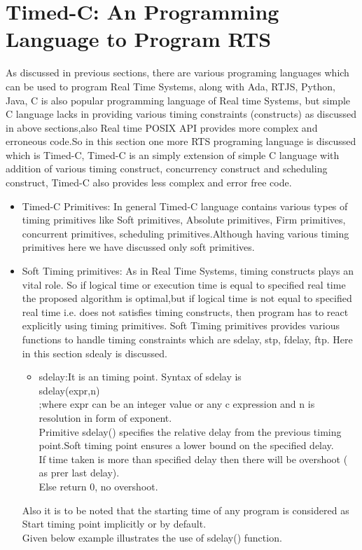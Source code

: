 \documentclass[conference]{IEEEtran}
\begin{document}
\section{Timed-C: An Programming Language to Program RTS}
As discussed in previous sections, there are various programing languages which can be used to program Real Time Systems, along with Ada, RTJS, Python, Java, C is also popular programming language of
Real time Systems, but simple C language lacks in providing various timing constraints (constructs) as discussed in above sections,also Real time POSIX API provides more complex and erroneous code.So in this section one more RTS programing language is discussed which is Timed-C, Timed-C is an simply extension of simple C language with addition of various timing construct, concurrency construct and scheduling construct, Timed-C also provides less complex and error free code.
\begin{itemize}
	\item Timed-C Primitives: In general Timed-C language contains various types of timing primitives like Soft primitives, Absolute primitives, Firm primitives, concurrent primitives, scheduling primitives.Although having various timing primitives here we have discussed only soft primitives.
\end{itemize}  
\begin{itemize}
	\item Soft Timing primitives: As in Real Time Systems, timing constructs plays an vital role. So if logical time or execution time is equal to specified real time the proposed algorithm is optimal,but if logical time is not equal to specified real time i.e. does not satisfies timing constructs, then program has to react explicitly using timing primitives. Soft Timing primitives provides various functions to handle timing constraints which are sdelay, stp, fdelay, ftp. Here in this section sdealy is discussed.
	\begin{itemize}
		\item sdelay:It is an timing point. Syntax of sdelay is \\sdelay(expr,n) \\;where expr can be an integer value or any c expression and n is resolution in form of exponent.
		\\Primitive sdelay() specifies the relative delay from the previous timing point.Soft timing point ensures a lower bound on the specified delay.
		\\If time taken is more than specified delay then there will be overshoot ( as prer last delay).
		\\Else return 0, no overshoot.
	\end{itemize} 
Also it is to be noted that the starting time of any program is considered as Start timing point implicitly or by default.	
\\Given below example illustrates the use of sdelay() function.
\end{itemize}
\end{document}

